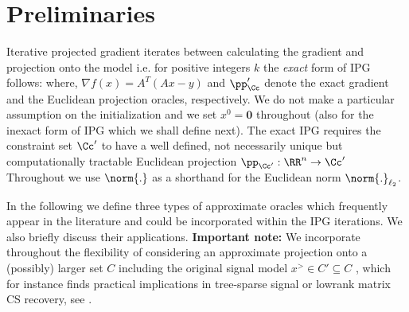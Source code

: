 \section{Preliminaries}\label{sec:prelim}
Iterative projected gradient iterates between calculating the gradient and projection onto the model 
i.e. for positive integers $k$ the \emph{exact} form of IPG follows:
where, $\nabla f(x)=A^T(Ax-y)$ and $\pp_\Cc'$ denote the exact gradient and the Euclidean projection oracles, respectively.  We do not make a particular assumption on  the initialization and we set $x^0=\mathbf{0}$ throughout (also for the inexact form of IPG which we shall define next). The exact IPG requires   
the constraint set $\Cc'$ 
 to have a well defined, not necessarily unique but  computationally tractable Euclidean projection $\pp_{\Cc'}:\RR^n\rightarrow \Cc'$ 
Throughout we use $\norm{.}$ as a shorthand for  the Euclidean norm $\norm{.}_{\ell_2}$. 

In the following we define three types of approximate oracles which frequently appear in the literature and could be incorporated within the IPG iterations. We also briefly discuss their applications. 
\newline
\textbf{Important note:} We incorporate throughout the flexibility of considering an approximate projection onto a (possibly) larger set $C$ including the original signal model $x^\gt \in C'\subseteq C$ , which for instance finds practical implications in tree-sparse signal or lowrank matrix CS recovery, see \cite{HegdeISIT,MatrixAlpsapprox}.
